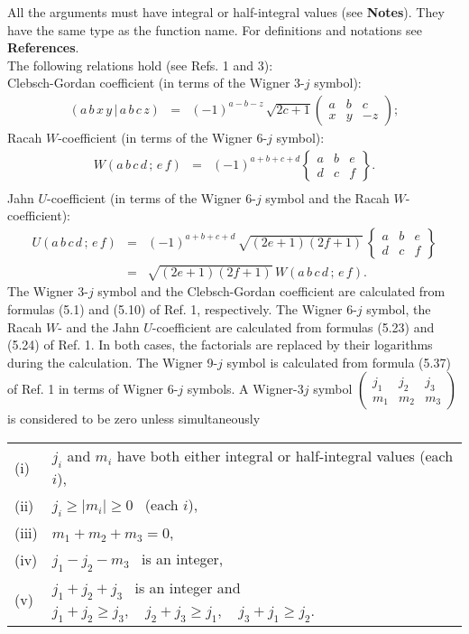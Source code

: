 All the arguments must have integral or half-integral values (see
{\bf Notes}). They have the same type as the function name.
For definitions and notations see {\bf References}. \\
The following relations hold (see Refs. 1 and 3): \\
Clebsch-Gordan coefficient (in terms of the Wigner 3-$j$ symbol):
\begin{eqnarray*}
(a\,b\,x\,y\,|\,a\,b\,c\,z) & = &
\displaystyle (-1)^{a-b-z}\,\sqrt{2c+1}
\left(\begin{array}{ccc} a & b & c \\ x & y & -z \end{array}\right);
\end{eqnarray*}
Racah $W$-coefficient (in terms of the Wigner 6-$j$ symbol):
\begin{eqnarray*}
W(a\,b\,c\,d\,;\,e\,f) & = &
\displaystyle (-1)^{a+b+c+d}
\left\{\begin{array}{ccc} a & b & e \\ d & c & f \end{array}\right\}. \\
\end{eqnarray*}
Jahn $U$-coefficient (in terms of the Wigner 6-$j$ symbol and the
Racah $W$-coefficient):
\begin{eqnarray*}
U(a\,b\,c\,d\,;\,e\,f) & = &
\displaystyle (-1)^{a+b+c+d}\,\sqrt{(2e+1)(2f+1)}\,
\left\{\begin{array}{ccc} a & b & e \\ d & c & f \end{array}\right\} \\
& = & \displaystyle \sqrt{(2e+1)(2f+1)}\,W(a\,b\,c\,d\,;\,e\,f).
\end{eqnarray*}
\Method
The Wigner 3-$j$ symbol and the Clebsch-Gordan coefficient are
calculated from formulas (5.1) and (5.10) of Ref. 1, respectively.
The Wigner 6-$j$ symbol, the Racah $W$- and the Jahn $U$-coefficient
are calculated from formulas (5.23) and (5.24) of Ref. 1.
In both cases, the factorials are replaced by their logarithms during
the calculation. The Wigner 9-$j$ symbol is calculated from formula
(5.37) of Ref. 1 in terms of Wigner 6-$j$ symbols.
\Notes
A Wigner-3$j$ symbol $\displaystyle \left(\begin{array}{ccc}
j_1 & j_2 & j_3 \\ m_1 & m_2 & m_3 \end{array}\right)$
is considered to be zero unless simultaneously \\
\begin{tabular}[t]{ll}
(i) & $j_i$ and $m_i$ have both either integral or half-integral
values (each $i$), \\
(ii) & $j_i \ge |m_i| \ge 0$ \ (each $i$), \\
(iii) & $m_1+m_2+m_3=0$, \\
(iv) & $j_1-j_2-m_3$ \ is an integer, \\
(v) & $j_1+j_2+j_3$ \ is an integer and \
$j_1+j_2 \ge j_3, \quad j_2+j_3 \ge j_1, \quad j_3+j_1 \ge j_2$.
\end{tabular}
